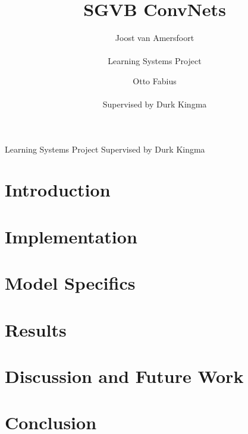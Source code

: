 \documentclass{article}
\title{SGVB ConvNets}
\author{Joost van Amersfoort \\ \\ Learning Systems Project \and Otto Fabius \\ \\ Supervised by Durk Kingma}
\begin{document}
\maketitle
\hspace{25mm} Learning Systems Project\hspace{20mm} Supervised by Durk Kingma
\tableofcontents
\newpage

\section{Introduction}


%

\section{Implementation}\label{implementation}


\section{Model Specifics}\label{model_specs}


\section{Results}\label{results}


\section{Discussion and Future Work}\label{discussion}


\section{Conclusion}\label{conclusion}


\pagebreak 
\nocite{*}


\end{document}
